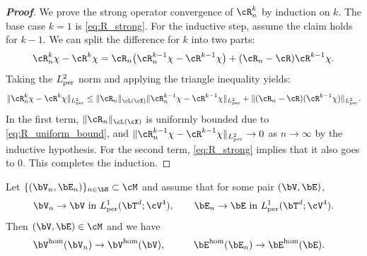 \begin{proof}[\bf Proof]
We prove the strong operator convergence of $\cR^k_n$ by induction on $k$. The base case $k=1$ is \cref{eq:R_strong}. For the inductive step, assume the claim holds for $k-1$. We can split the difference for $k$ into two parts:
\begin{equation*}
\cR_n^k\chi-\cR^k\chi=\cR_n\bigl(\cR_n^{k-1}\chi-\cR^{k-1}\chi\bigr)+(\cR_n-\cR)\cR^{k-1}\chi.
\end{equation*}
Taking the $L^2_{\rm per}$ norm and applying the triangle inequality yields:
\begin{equation*}
\|\cR_n^k\chi-\cR^k\chi\|_{L^2_{\rm per}} \le \|\cR_n\|_{\cL(\cX)} \|\cR_n^{k-1}\chi-\cR^{k-1}\chi\|_{L^2_{\rm per}} + \|(\cR_n-\cR)(\cR^{k-1}\chi)\|_{L^2_{\rm per}}.
\end{equation*}
In the first term, $\|\cR_n\|_{\cL(\cX)}$ is uniformly bounded due to \cref{eq:R_uniform_bound}, and $\|\cR_n^{k-1}\chi-\cR^{k-1}\chi\|_{L^2_{\rm per}} \to 0$ as $n \to \infty$ by the inductive hypothesis. For the second term, \cref{eq:R_strong} implies that it also goes to $0$. This completes the induction.
\end{proof}


\begin{corollary}\label{cor:continuity_tensors}
Let $\{(\bV_n,\bE_n)\}_{n\in\bN}\subset\cM$ and assume that for some pair $(\bV,\bE)$,
\begin{equation}\label{eq:micro_conv_L1_cor}
\bV_n\to\bV \ \text{in }L^1_{\rm per}(\bT^d;\cV^4),\qquad
\bE_n\to\bE \ \text{in }L^1_{\rm per}(\bT^d;\cV^4).
\end{equation}
Then $(\bV,\bE)\in\cM$ and we have
\begin{equation}\label{eq:Vhom_Ehom_cont}
\begin{aligned}
    \bV^{\mathrm{hom}}(\bV_n)&\to \bV^{\mathrm{hom}}(\bV),
    &\qquad
    \bE^{\mathrm{hom}}(\bE_n)&\to \bE^{\mathrm{hom}}(\bE).
\end{aligned}
\end{equation}
\end{corollary}

